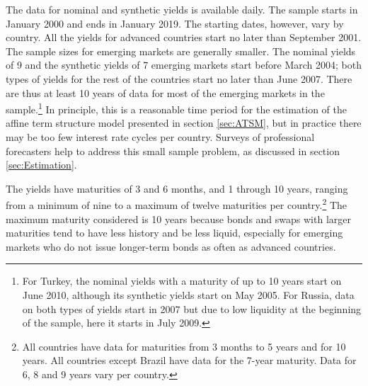 {The data for nominal and synthetic yields is available daily. 
The sample starts in January 2000 and ends in January 2019. The starting dates, however,
vary by country.
All the yields for advanced countries start no later than September 2001.
The sample sizes for emerging markets are generally smaller.
The nominal yields of 9 and the synthetic yields of 7 emerging markets start before March 2004; both types of yields for the rest of the countries start no later than June 2007.
There are thus at least 10 years of data for most of the emerging markets in the sample.\footnote{ For Turkey, the nominal yields with a maturity of up to 10 years start on June 2010, although its synthetic yields start on May 2005. For Russia, data on both types of yields start in 2007 but due to low liquidity at the beginning of the sample, here it starts in July 2009.}
In principle, this is a reasonable time period for the estimation of the affine term structure model presented in section \ref{sec:ATSM}, but in practice there may be too few interest rate cycles per country.
Surveys of professional forecasters help to address this small sample problem, as discussed in section \ref{sec:Estimation}. 

The yields have maturities of 3 and 6 months, and 1 through 10 years, ranging from a minimum of nine to a maximum of twelve maturities per country.\footnote{ All countries have data for maturities from 3 months to 5 years and for 10 years. All countries except Brazil have data for the 7-year maturity. Data for 6, 8 and 9 years vary per country.} 
The maximum maturity considered is 10 years because bonds and swaps with larger maturities tend to have less history and be less liquid, especially for emerging markets who do not issue longer-term bonds as often as advanced countries.
%	

}
